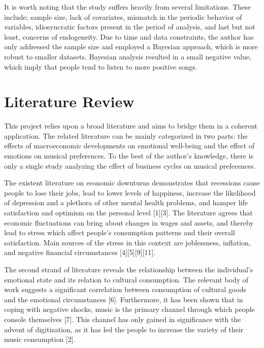\documentclass[12pt]{article}
\begin{document}
It is worth noting that the study suffers heavily from several limitations. These include; sample size, lack of covariates, mismatch in the periodic behavior of variables, idiosyncratic factors present in the period of analysis, and last but not least, concerns of endogeneity. Due to time and data constraints, the author has only addressed the sample size and employed a Bayesian approach, which is more robust to smaller datasets. Bayesian analysis resulted in a small negative value, which imply that people tend to listen to more positive songs. 

\section{Literature Review}

This project relies upon a broad literature and aims to bridge them in a coherent application. The related literature can be mainly categorized in two parts: the effects of macroeconomic developments on emotional well-being and the effect of emotions on musical preferences. To the best of the author's knowledge, there is only a single study analyzing the effect of business cycles on musical preferences.

The existent literature on economic downturns demonstrates that recessions cause people to lose their jobs, lead to lower levels of happiness, increase the likelihood of depression and a plethora of other mental health problems, and hamper life satisfaction and optimism on the personal level [1][3]. The literature  agrees that economic fluctuations can bring about changes in wages and assets, and thereby lead to stress which affect people's consumption patterns and their overall satisfaction. Main sources of the stress in this context are joblessness, inflation, and negative financial circumstances [4][5][9][11].

The second strand of literature reveals the relationship between the individual's emotional state and its relation to cultural consumption. The relevant body of work suggests a significant correlation between consumption of cultural goods and the emotional circumstances [6]. Furthermore, it has been shown that in coping with negative shocks, music is the primary channel through which people console themselves [7]. This channel has only gained in significance with the advent of digitization, as it has led the people to increase the variety of their music consumption [2].
\end{document}
